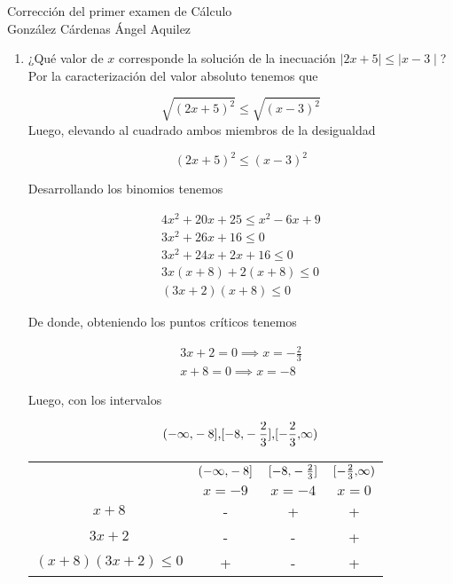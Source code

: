 \documentclass[a4paper,12pt]{report}
\begin{document}
\begin{center}
\Huge{Corrección del primer examen de Cálculo}\\
\vspace{0.5cm}
\Large{González Cárdenas Ángel Aquilez} \\
\end{center}

\vspace{0.5cm}

\begin{enumerate}

\item ¿Qué valor de $x$ corresponde la solución de la inecuación $\mid 2x + 5 \mid \leq \mid x-3 \mid$? \\

Por la caracterización del valor absoluto tenemos que

\[
	\sqrt{(2x+5)^2} \leq \sqrt{(x-3)^2}
\]
Luego, elevando al cuadrado ambos miembros de la desigualdad

\[
	(2x+5)^2 \leq (x-3)^2
\]

Desarrollando los binomios tenemos

\vspace{-0.5cm}

\begin{align*}
	4x^2 +20x +25 \leq x^2 -6x +9 \\
	3x^2 +26x +16 \leq 0 \\
	3x^2 +24x +2x +16 \leq 0 \\
	3x(x + 8) + 2(x + 8) \leq 0 \\
	(3x + 2)(x + 8) \leq 0
\end{align*}

De donde, obteniendo los puntos críticos tenemos

\begin{align*}
	3x+2 = 0 \implies x = -\frac{2}{3} \\
	x+8 = 0 \implies x = -8
\end{align*}

Luego, con los intervalos

\[  \interval({-\infty,-8}] \text{,} \interval[{-8, -\frac{2}{3}}] \text{,} \interval[{-\frac{2}{3},\infty}) \]


\bgroup
\def\arraystretch{1.5}%
\begin{table}[ht!]
\begin{center}
\begin{tabular}{ c | c  c  c }
		& $\interval({-\infty,-8}]$ & $\interval[{-8, -\frac{2}{3}}]$ & $\interval[{-\frac{2}{3},\infty})$ \\ [0.5ex]
	& $x=-9$ & $x=-4$ 	& $x=0$ \\ 	\hline
	$x+8$ & - & + & + \\
	$3x+2$ & - & - & + \\
	$(x+8)(3x+2)\leq 0$ & + & - & + \\ 
\end{tabular}
\end{center}
\end{table}



\end{enumerate}
\end{document}
